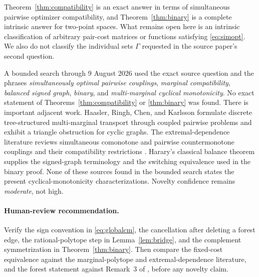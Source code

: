 \documentclass[11pt]{article}
\newcommand{\1}{\mathbf 1}
\begin{document}
Theorem~\ref{thm:compatibility} is an exact answer in terms of simultaneous
pairwise optimizer compatibility, and Theorem~\ref{thm:binary} is a complete
intrinsic answer for two-point spaces.  What remains open here is an
intrinsic classification of arbitrary pair-cost matrices or functions
satisfying \eqref{eq:simopt}.  We also do not classify the individual sets
$\Gamma$ requested in the source paper's second question.

A bounded search through 9 August 2026 used the exact source question and
the phrases \emph{simultaneously optimal pairwise couplings},
\emph{marginal compatibility}, \emph{balanced signed graph},
\emph{binary}, and \emph{multi-marginal cyclical monotonicity}.  No exact
statement of Theorems~\ref{thm:compatibility} or \ref{thm:binary} was found.
There is important adjacent work.  Haasler, Ringh, Chen, and Karlsson
\cite{HRCK} formulate discrete tree-structured multi-marginal transport
through coupled pairwise problems and exhibit a triangle obstruction for
cyclic graphs.  The extremal-dependence literature reviews simultaneous
comonotone and pairwise countermonotone couplings and their compatibility
restrictions \cite{PW,LLW}.  Harary's classical balance theorem
\cite{Harary} supplies the signed-graph terminology and the switching
equivalence used in the binary proof.  None of these sources found in the
bounded search states the present cyclical-monotonicity characterizations.
Novelty confidence remains \emph{moderate}, not high.

\paragraph{Human-review recommendation.}
Verify the sign convention in \eqref{eq:globalcm}, the cancellation after
deleting a forest edge, the rational-polytope step in
Lemma~\ref{lem:bridge}, and the complement symmetrization in
Theorem~\ref{thm:binary}.  Then compare the fixed-cost equivalence against
the marginal-polytope and extremal-dependence literature, and the forest
statement against Remark~3 of \cite{HRCK}, before any novelty claim.
\end{document}

